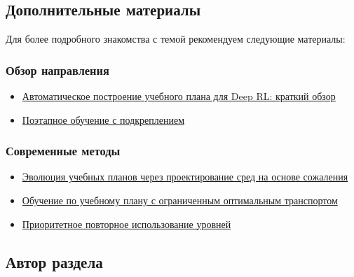 \documentclass[11pt,a4paper]{article}
\begin{document}

\subsection{Дополнительные материалы}\label{further-reading}

Для более подробного знакомства с темой рекомендуем следующие материалы:

\subsubsection{Обзор направления}\label{overview-of-the-field}

\begin{itemize}
\item
  \href{https://arxiv.org/pdf/2003.04664.pdf}{Автоматическое построение учебного плана для Deep RL: краткий обзор}
\item
  \href{https://lilianweng.github.io/posts/2020-01-29-curriculum-rl/}{Поэтапное обучение с подкреплением}
\end{itemize}

\subsubsection{Современные методы}\label{recent-methods}

\begin{itemize}
\item
  \href{https://arxiv.org/abs/2203.01302}{Эволюция учебных планов через проектирование сред на основе сожаления}
\item
  \href{https://proceedings.mlr.press/v162/klink22a.html}{Обучение по учебному плану с ограниченным оптимальным транспортом}
\item
  \href{https://arxiv.org/abs/2010.03934}{Приоритетное повторное использование уровней}
\end{itemize}

\subsection{Автор раздела}\label{author}
\end{document}
